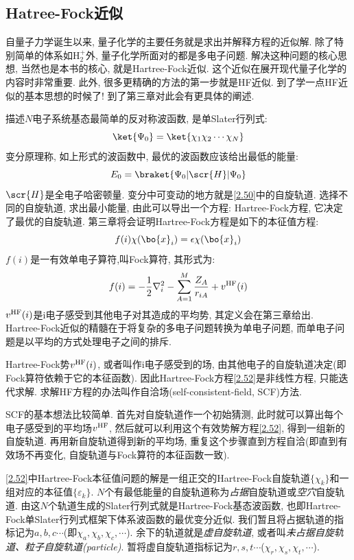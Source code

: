 \subsection{Hatree-Fock近似}
 \label{sec2.2.4}
自量子力学诞生以来, 
量子化学的主要任务就是求出并解释\sch 方程的近似解. 
除了特别简单的体系如$\text{H}^+_2$外, 
量子化学所面对的都是多电子问题. 
解决这种问题的核心思想, 
当然也是本书的核心, 
就是Hartree-Fock近似. 
这个近似在展开现代量子化学的内容时非常重要. 
此外, 
很多更精确的方法的第一步就是HF近似. 
到了学一点HF近似的基本思想的时候了! 到了第三章对此会有更具体的阐述.


描述$N$电子系统基态最简单的反对称波函数, 
是单Slater行列式:
\begin{equation}
\label{2.50}
\ket{\Psi_0}=\ket{\chi_1\chi_2\cdots\chi_N}
\end{equation}
变分原理称, 
如上形式的波函数中, 
最优的波函数应该给出最低的能量:
\begin{equation}
E_0=\braket{\Psi_0|\scr{H}|\Psi_0}
\end{equation}
$\scr{H}$是全电子哈密顿量. 
变分中可变动的地方就是\autoref{2.50}中的自旋轨道. 
选择不同的自旋轨道, 
求出最小能量, 
由此可以导出一个方程: Hartree-Fock方程, 
它决定了最优的自旋轨道. 
第三章将会证明Hartree-Fock方程是如下的本征值方程:
\begin{equation}
f(i)\chi(\bo{x}_i)=\epsilon\chi(\bo{x}_i)
\label{2.52}
\end{equation}
$f(i)$是一有效单电子算符,叫Fock算符, 其形式为:
\begin{equation}
\label{2.53}
f(i)=-\frac{1}{2}\nabla_i^2 - \sum_{A=1}^M\frac{Z_A}{r_{iA}} + v^{\rm HF}(i)
\end{equation}
$v^{\rm HF}(i)$是i电子感受到其他电子对其造成的平均势, 其定义会在第三章给出. Hartree-Fock近似的精髓在于将复杂的多电子问题转换为单电子问题, 而单电子问题是以平均的方式处理电子之间的排斥.

Hartree-Fock势$v^{\rm HF}(i)$, 或者叫作i电子感受到的场, 由其他电子的自旋轨道决定(即Fock算符依赖于它的本征函数).  因此Hartree-Fock方程\autoref{2.52}是非线性方程, 只能迭代求解. 求解HF方程的办法叫作自洽场(self-consistent-field, SCF)方法.

SCF的基本想法比较简单. 首先对自旋轨道作一个初始猜测, 此时就可以算出每个电子感受到的平均场$v^{\rm HF}$, 然后就可以利用这个有效势解方程\autoref{2.52}, 得到一组新的自旋轨道. 再用新自旋轨道得到新的平均场, 重复这个步骤直到方程自洽(即直到有效场不再变化, 自旋轨道与Fock算符的本征函数一致).

\autoref{2.52}中Hartree-Fock本征值问题的解是一组正交的Hartree-Fock自旋轨道$\{\chi_k\}$和一组对应的本征值$\{\varepsilon_k\}$. 
$N$个有最低能量的自旋轨道称为\emph{占据}自旋轨道或\emph{空穴}自旋轨道. 
由这$N$个轨道生成的Slater行列式就是Hartree-Fock基态波函数, 
也即Hartree-Fock单Slater行列式框架下体系波函数的最优变分近似. 
我们暂且将占据轨道的指标记为$a,b,c\cdots$(即$\chi_a,\chi_b,\chi_c,\cdots$). 
余下的轨道就是\emph{虚自旋轨道}, 或者叫\emph{未占据自旋轨道、粒子自旋轨道(particle)}. 
暂将虚自旋轨道指标记为$r,s,t\cdots$($\chi_r,\chi_s,\chi_t,\cdots$).

